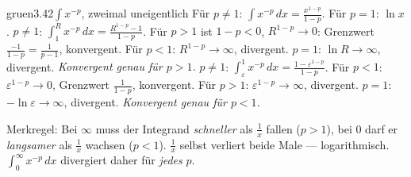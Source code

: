 \begin{loesungkarte}{gruen}{3.42}{$\int x^{-p}$, zweimal uneigentlich}
Für $p\neq1$: $\int x^{-p}\,dx = \frac{x^{1 - p}}{1 - p}$. Für $p = 1$: $\ln x$.
$p\neq1$: $\int_1^Rx^{-p}\,dx = \frac{R^{1 - p} - 1}{1 - p}$. Für $p > 1$ ist $1 - p < 0$, $R^{1 - p}\to0$: Grenzwert $\frac{-1}{1 - p} = \frac1{p - 1}$, konvergent. Für $p < 1$: $R^{1 - p}\to\infty$, divergent. $p = 1$: $\ln R\to\infty$, divergent. \emph{Konvergent genau für $p > 1$.}
$p\neq1$: $\int_\varepsilon^1x^{-p}\,dx = \frac{1 - \varepsilon^{1 - p}}{1 - p}$. Für $p < 1$: $\varepsilon^{1 - p}\to0$, Grenzwert $\frac1{1 - p}$, konvergent. Für $p > 1$: $\varepsilon^{1 - p}\to\infty$, divergent. $p = 1$: $-\ln\varepsilon\to\infty$, divergent. \emph{Konvergent genau für $p < 1$.}
\begin{mitnehmen}\kastentext
Merkregel: Bei $\infty$ muss der Integrand \emph{schneller} als $\frac1x$ fallen ($p > 1$), bei $0$ darf er \emph{langsamer} als $\frac1x$ wachsen ($p < 1$). $\frac1x$ selbst verliert beide Male --- logarithmisch. $\int_0^{\infty}x^{-p}\,dx$ divergiert daher für \emph{jedes} $p$.
\end{mitnehmen}
\end{loesungkarte}

